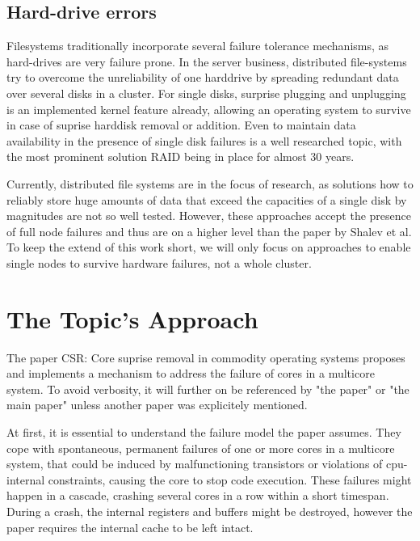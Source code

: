 \documentclass[a4paper,10pt,twoside]{article}
\begin{document}
\subsection{Hard-drive errors}
Filesystems traditionally incorporate several failure tolerance mechanisms, as hard-drives are very failure prone. In the server business, distributed file-systems try to overcome the unreliability of one harddrive by spreading redundant data over several disks in a cluster. For single disks, surprise plugging and unplugging is an implemented kernel feature already, allowing an operating system to survive in case of suprise harddisk removal or addition. %
Even to maintain data availability in the presence of single disk failures is a well researched topic, with the most prominent solution RAID \cite{RAID} being in place for almost 30 years.

Currently, distributed file systems are in the focus of research, as solutions how to reliably store huge amounts of data that exceed the capacities of a single disk by magnitudes are not so well tested. However, these approaches accept the presence of full node failures and thus are on a higher level than the paper by Shalev et al. To keep the extend of this work short, we will only focus on approaches to enable single nodes to survive hardware failures, not a whole cluster.

\section{The Topic's Approach}
The paper CSR: Core suprise removal in commodity operating systems \cite{CSR} proposes and implements a mechanism to address the failure of cores in a multicore system. To avoid verbosity, it will further on be referenced by "the paper" or "the main paper" unless another paper was explicitely mentioned.

At first, it is essential to understand the failure model the paper assumes. They cope with spontaneous, permanent failures of one or more cores in a multicore system, that could be induced by malfunctioning transistors or violations of cpu-internal constraints, causing the core to stop code execution. These failures might happen in a cascade, crashing several cores in a row within a short timespan. During a crash, the internal registers and buffers might be destroyed, however the paper requires the internal cache to be left intact.
\end{document}
